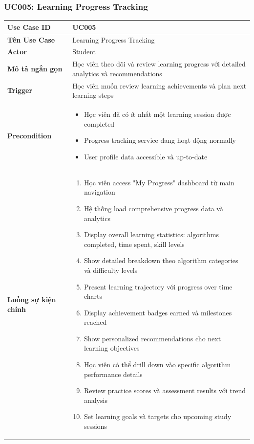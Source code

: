 \subsubsection{UC005: Learning Progress Tracking}

\begin{longtable}{| p{3cm} | p{10cm} |}
\hline
\textbf{Use Case ID} & UC005 \\ \hline
\textbf{Tên Use Case} & Learning Progress Tracking \\ \hline
\textbf{Actor} & Student \\ \hline
\textbf{Mô tả ngắn gọn} & Học viên theo dõi và review learning progress với detailed analytics và recommendations \\ \hline
\textbf{Trigger} & Học viên muốn review learning achievements và plan next learning steps \\ \hline
\textbf{Precondition} & 
\begin{itemize}
    \item Học viên đã có ít nhất một learning session được completed
    \item Progress tracking service đang hoạt động normally
    \item User profile data accessible và up-to-date
\end{itemize} \\ \hline
\textbf{Luồng sự kiện chính} & 
\begin{enumerate}
    \item Học viên access "My Progress" dashboard từ main navigation
    \item Hệ thống load comprehensive progress data và analytics
    \item Display overall learning statistics: algorithms completed, time spent, skill levels
    \item Show detailed breakdown theo algorithm categories và difficulty levels
    \item Present learning trajectory với progress over time charts
    \item Display achievement badges earned và milestones reached
    \item Show personalized recommendations cho next learning objectives
    \item Học viên có thể drill down vào specific algorithm performance details
    \item Review practice scores và assessment results với trend analysis
    \item Set learning goals và targets cho upcoming study sessions

\end{enumerate}
\end{longtable}
